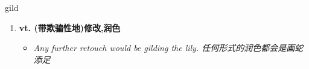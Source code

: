 
\begin{frame}
{\huge gild}
\begin{center}
\begin{enumerate}\Large
  \item \textbf{vt. (带欺骗性地)修改,润色}
  \begin{itemize}
    \item \em{\Large{Any further retouch would be gilding the lily. 任何形式的润色都会是画蛇添足}}
  \end{itemize}
\end{enumerate}
\end{center}
\end{frame}
